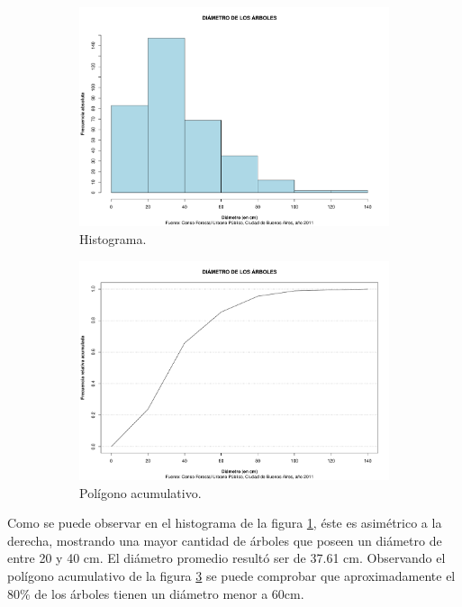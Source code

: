\documentclass[11pt]{article}
\begin{document}
\begin{figure}[h!]
  \begin{center}
    \begin{subfigure}[b]{0.49\linewidth}
      \includegraphics[width=\linewidth]{histDiametro.pdf}
      \caption{Histograma.}
      \label{fig:histDiametro}
    \end{subfigure}
    \begin{subfigure}[b]{0.49\linewidth}
      \includegraphics[width=\linewidth]{acumDiametro.pdf}
      \caption{Polígono acumulativo.}
      \label{fig:acumDiametro}
    \end{subfigure}
  \caption{}
  \end{center}  
\end{figure}

\begin{justify}
  Como se puede observar en el histograma de la figura \ref{fig:histDiametro}, 
  éste es asimétrico a la derecha, mostrando una mayor cantidad de árboles que
  poseen un diámetro de entre 20 y 40 cm. El diámetro promedio resultó ser 
  de 37.61 cm. Observando el polígono acumulativo de la figura
  \ref{fig:acumDiametro} se puede comprobar que aproximadamente el 80\%
  de los árboles tienen un diámetro menor a 60cm.
\end{justify}
\end{document}
